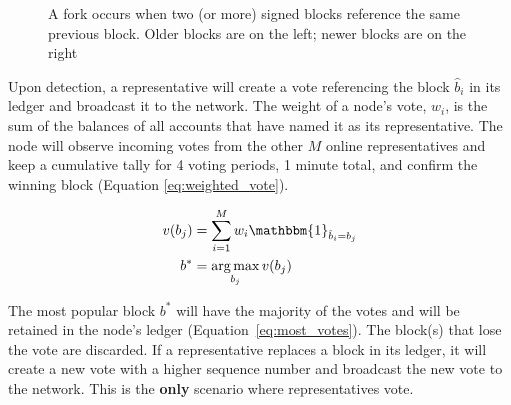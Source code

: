 \begin{figure}[!ht]
   \centering
   \caption{A fork occurs when two (or more) signed blocks reference the same previous block. Older blocks are on the left; newer blocks are on the right}
   \label{fig:fork}
\end{figure}

Upon detection, a representative will create a vote referencing the block $\hat{b}_i$ in its ledger and broadcast it to the network. The weight of a node's vote, $w_i$, is the sum of the balances of all accounts that have named it as its representative. The node will observe incoming votes from the other $M$ online representatives and keep a cumulative tally for 4 voting periods, 1 minute total, and confirm the winning block (Equation \ref{eq:weighted_vote}).

\begin{align}
   v(b_j) &= \sum_{i=1}^M w_i\mathbbm{1}_{\hat{b}_i=b_j} \label{eq:weighted_vote} \\
   b^* &= \argmax_{b_j} v(b_j) \label{eq:most_votes}
\end{align}

The most popular block $b^*$ will have the majority of the votes and will be retained in the node's ledger (Equation~\ref{eq:most_votes}). The block(s) that lose the vote are discarded. If a representative replaces a block in its ledger, it will create a new vote with a higher sequence number and broadcast the new vote to the network. This is the \textbf{only} scenario where representatives vote.

